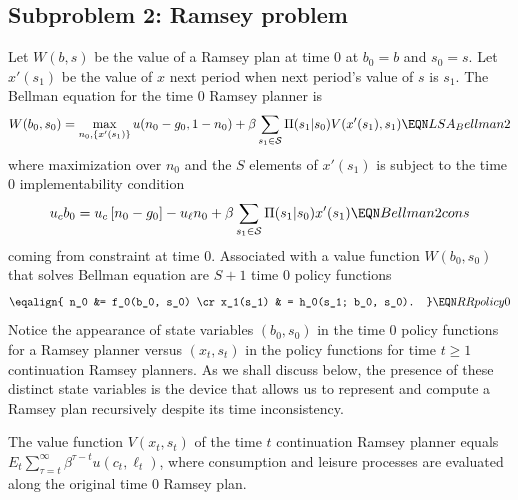 \subsection{Subproblem 2:  Ramsey problem}
 Let $W(b, s)$ be the value of a Ramsey plan at time $0$ at $b_0=b$ and $s_0 = s$.
Let $x'(s_1)$ be the value of $x$ next period when next period's value of $s$ is $s_1$.
The Bellman equation for the time $0$ Ramsey planner is
$$ W(b_0, s_0) = \max_{n_0, \{x'(s_1)\}} u(n_0 - g_0, 1 - n_0) + \beta \sum_{s_1 \in {\cal S}} \Pi(s_1| s_0) V( x'(s_1), s_1)  \EQN LSA_Bellman2 $$
where  maximization over $n_0$ and the $S $ elements of $x'(s_1)$ is subject to the time $0$ implementability condition
$$   u_{c} b_0 = u_{c} \left[n_0 - g_0\right] - u_{\ell} n_0  + \beta \sum_{s_1\in {\cal S}} \Pi(s_1 | s_0) x'(s_1) \EQN Bellman2cons $$
coming from constraint  at time $0$.
Associated with a value function $W(b_0, s_0)$ that solves Bellman equation  are $S +1 $
time $0$ policy functions
$$ \eqalign{ n_0 &= f_0(b_0, s_0) \cr
             x_1(s_1) & = h_0(s_1; b_0, s_0). } \EQN RRpolicy0 $$
Notice the appearance of  state variables $(b_0, s_0)$ in the time $0$ policy functions
 for a Ramsey planner versus  $(x_t, s_t)$ in the policy functions  for   time $t \geq 1$ continuation  Ramsey planners.
As we shall discuss below, the presence of these distinct state variables is the device that allows
us to represent and compute a  Ramsey plan  recursively despite its  time inconsistency.
%
%
%



 The value function $V(x_t, s_t)$ of the time $t$ continuation Ramsey planner   equals
$E_t \sum_{\tau = t}^\infty \beta^{\tau - t} u(c_t, \ell_t)$, where  consumption and leisure processes are evaluated along the original time $0$ Ramsey plan.





